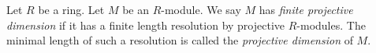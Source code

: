 \begin{definition}
\label{definition-finite-proj-dim}
Let $R$ be a ring. Let $M$ be an $R$-module. We say $M$ has
{\it finite projective dimension} if it has a finite length
resolution by projective $R$-modules. The minimal length of such a
resolution is called the {\it projective dimension}
of $M$.
\end{definition}